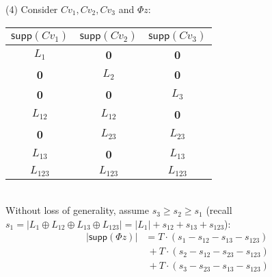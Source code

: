 \documentclass[twocolumn]{autart}    %
\begin{document}
{(4) Consider $Cv_1, Cv_2, Cv_3$ and $\Phi z$:\\

\begin{tabular}[!b]{ccc} 
  \hline
  $\textsf{supp}(Cv_1)$ &   $\textsf{supp}(Cv_2)$ &   $\textsf{supp}(Cv_3)$\\
  \hline
	$ L_1$ & {\bf 0 } & {\bf 0} \\
  {\bf 0}  &  $L_2$ & {\bf 0} \\
  {\bf 0} & {\bf 0} &  $L_3$ \\
 $ L_{12}$ &  $ L_{12}$ & {\bf 0 } \\
  {\bf 0} &  $ L_{23}$ &    $ L_{23}$ \\
 $ L_{13}$ & {\bf 0} &   $ L_{13}$  \\
$L_{123}$ &   $L_{123}$ &  $L_{123}$\\
  \hline
\end{tabular}%
\bigskip\\
\noindent Without loss of generality, assume $s_3\ge s_2 \ge s_1$ (recall $s_1 = \vert L_1 \oplus L_{12} \oplus L_{13} \oplus L_{123} \vert = \lvert L_1 \rvert + s_{12} + s_{13} + s_{123}$):
\begin{equation}
\begin{aligned}
	\lvert \textsf{supp}(\Phi z) \rvert  &=  T \cdot(s_1 - s_{12} - s_{13} - s_{123}) \\&~ + T \cdot(s_2 - s_{12} - s_{23} - s_{123}) \\&~ + T \cdot(s_3 - s_{23} - s_{13} - s_{123}) \\ 

\end{aligned}
\end{equation}}
\end{document}
